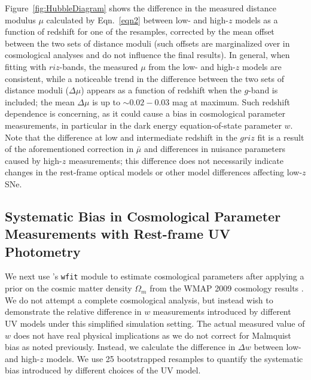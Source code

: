 \documentclass[twocolumn,tighten,times,floatfix]{aastex631}
\newcommand{\snana}{{\fontfamily{qcr}\selectfont{SNANA}}}
\begin{document}
Figure~\ref{fig:HubbleDiagram} shows the difference in the measured distance modulus $\mu$ calculated by Eqn.~\ref{eqn2} between low- and high-$z$ models as a function of redshift for one of the resamples, corrected by the mean offset between the two sets of distance moduli (such offsets are marginalized over in cosmological analyses and do not influence the final results). 
In general, when fitting with $riz$-bands, the measured $\mu$ from the low- and high-$z$ models are consistent, while a noticeable trend in the difference between the two sets of distance moduli ($\Delta\mu$) appears as a function of redshift when the $g$-band is included; the mean $\Delta\mu$ is up to $\sim 0.02-0.03$ mag at maximum. 
Such redshift dependence is concerning, as it could cause a bias in cosmological parameter measurements, in particular in the dark energy equation-of-state parameter $w$.
Note that the difference at low and intermediate redshift in the $griz$ fit is a result of the aforementioned correction in $\bar \mu$ and differences in nuisance parameters caused by high-$z$ measurements;  this difference does not necessarily indicate changes in the rest-frame optical models or other model differences affecting low-$z$ SNe.



\subsection{Systematic Bias in Cosmological Parameter Measurements with Rest-frame UV Photometry}





We next use \snana 's {\tt wfit} module to estimate cosmological parameters after applying a prior on the cosmic matter density $\Omega_m$ from the WMAP 2009 cosmology results \citep{WMAP09}. 
We do not attempt a complete cosmological analysis, but instead wish to demonstrate the relative difference in $w$ measurements introduced by different UV models under this simplified simulation setting.
The actual measured value of $w$ does not have real physical implications as we do not correct for Malmquist bias as noted previously. Instead, we calculate the difference in $\Delta w$ between low- and high-$z$ models.  We use 25 bootstrapped resamples to quantify the systematic bias introduced by different choices of the UV model.  
\end{document}
